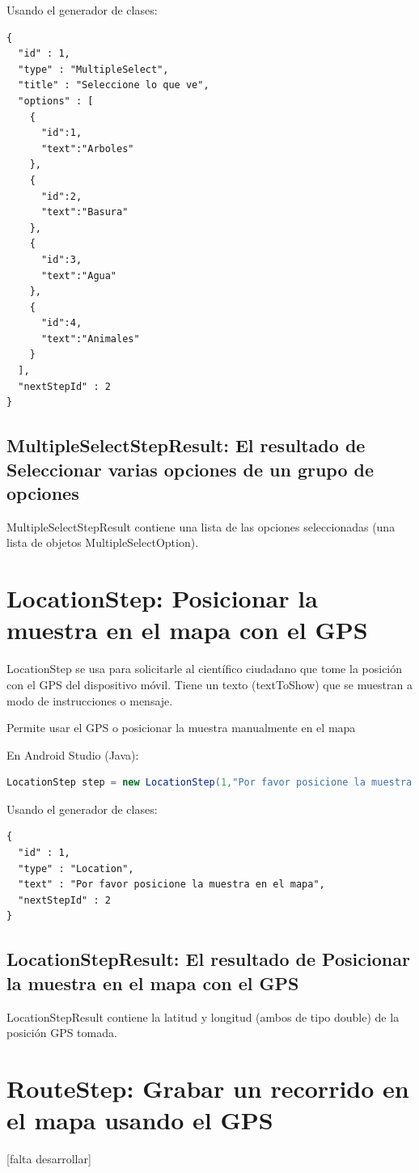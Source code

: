 Usando el generador de clases:
\begin{lstlisting}[language=XML, frame=tlb]	
{
  "id" : 1,
  "type" : "MultipleSelect",
  "title" : "Seleccione lo que ve",
  "options" : [
    {
      "id":1,
      "text":"Arboles"
    },
    {
      "id":2,
      "text":"Basura"
    },
    {
      "id":3,
      "text":"Agua"
    },
    {
      "id":4,
      "text":"Animales"
    }
  ],
  "nextStepId" : 2
}
\end{lstlisting}

\subsection{MultipleSelectStepResult: El resultado de Seleccionar varias opciones de un grupo de opciones}
MultipleSelectStepResult contiene una lista de las opciones seleccionadas (una lista de objetos MultipleSelectOption).


\section{LocationStep: Posicionar la muestra en el mapa con el GPS}
LocationStep se usa para solicitarle al científico ciudadano que tome la posición con el GPS del dispositivo móvil. Tiene un texto (textToShow) que se muestran a modo de instrucciones o mensaje. 

Permite usar el GPS o posicionar la muestra manualmente en el mapa

En Android Studio (Java):
\begin{lstlisting}[language=Java, frame=tlb]	
LocationStep step = new LocationStep(1,"Por favor posicione la muestra en el mapa",2); 
\end{lstlisting}

Usando el generador de clases:
\begin{lstlisting}[language=XML, frame=tlb]	
{
  "id" : 1,
  "type" : "Location",
  "text" : "Por favor posicione la muestra en el mapa",
  "nextStepId" : 2
}
\end{lstlisting}

\subsection{LocationStepResult: El resultado de Posicionar la muestra en el mapa con el GPS}
LocationStepResult contiene la latitud y longitud (ambos de tipo double) de la posición GPS tomada.


\section{RouteStep: Grabar un recorrido en el mapa usando el GPS}
[falta desarrollar]

